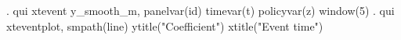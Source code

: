 . qui xtevent y_smooth_m, panelvar(id) timevar(t) policyvar(z) window(5)
{\smallskip}
. qui xteventplot, smpath(line) ytitle("Coefficient") xtitle("Event time")
{\smallskip}
